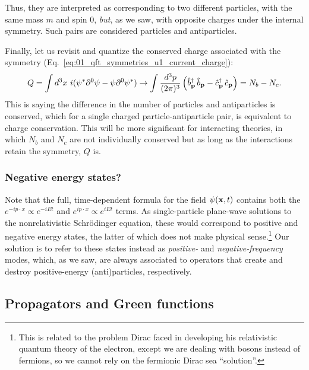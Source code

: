 Thus, they are interpreted as corresponding to two different particles, with the same mass $m$ and spin 0, \textit{but}, as we saw, with opposite charges under the \UU[1] internal symmetry.
Such pairs are considered particles and antiparticles.

Finally, let us revisit and quantize the conserved charge associated with the \UU[1] symmetry (Eq.~\ref{eq:01_qft_symmetries_u1_current_charge}):
\begin{equation}
    \label{eq:01_qft_quantization_complex_charge}
    Q = \int d^3x\ i(\psi^*\partial^0\psi - \psi\partial^0\psi^*) \rightarrow \int \frac{d^3p}{(2\pi)^3} \left(\hat b^\dagger_{\mathbf{p}}\,\hat b_{\mathbf{p}} - \hat c^\dagger_{\mathbf{p}}\,\hat c_{\mathbf{p}}\right) = N_b - N_c.
\end{equation}
This is saying the difference in the number of particles and antiparticles is conserved, which for a single charged particle-antiparticle pair, is equivalent to charge conservation.
This will be more significant for interacting theories, in which $N_b$ and $N_c$ are not individually conserved but as long as the interactions retain the \UU[1] symmetry, $Q$ is.

\subsubsection{Negative energy states?} 

Note that the full, time-dependent formula for the field $\psi(\mathbf{x}, t)$ contains both the $e^{-ip\cdot x}\propto e^{-iEt}$ and $e^{ip\cdot x}\propto e^{iEt}$ terms.
As single-particle plane-wave solutions to the nonrelativistic Schr\"odinger equation, these would correspond to positive and negative energy states, the latter of which does not make physical sense.\footnote{This is related to the problem Dirac faced in developing his relativistic quantum theory of the electron, except we are dealing with bosons instead of fermions, so we cannot rely on the fermionic Dirac sea ``solution''.}
Our solution is to refer to these states instead as \textit{positive-} and \textit{negative-frequency} modes, which, as we saw, are always associated to operators that create and destroy positive-energy (anti)particles, respectively.


\subsection{Propagators and Green functions}
\label{sec:01_qft_quantization_propagators}

